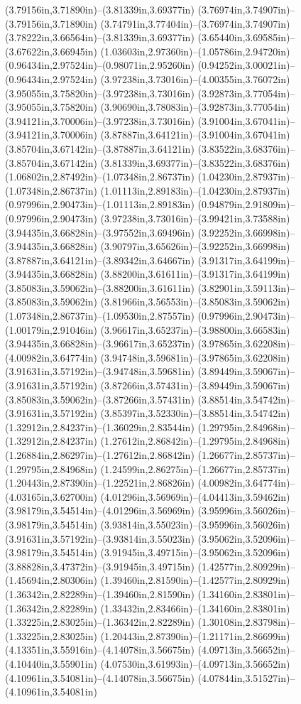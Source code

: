 (3.79156in,3.71890in)--(3.81339in,3.69377in) (3.76974in,3.74907in)--(3.79156in,3.71890in) (3.74791in,3.77404in)--(3.76974in,3.74907in) (3.78222in,3.66564in)--(3.81339in,3.69377in) (3.65440in,3.69585in)--(3.67622in,3.66945in) (1.03603in,2.97360in)--(1.05786in,2.94720in) (0.96434in,2.97524in)--(0.98071in,2.95260in) (0.94252in,3.00021in)--(0.96434in,2.97524in) (3.97238in,3.73016in)--(4.00355in,3.76072in) (3.95055in,3.75820in)--(3.97238in,3.73016in) (3.92873in,3.77054in)--(3.95055in,3.75820in) (3.90690in,3.78083in)--(3.92873in,3.77054in) (3.94121in,3.70006in)--(3.97238in,3.73016in) (3.91004in,3.67041in)--(3.94121in,3.70006in) (3.87887in,3.64121in)--(3.91004in,3.67041in) (3.85704in,3.67142in)--(3.87887in,3.64121in) (3.83522in,3.68376in)--(3.85704in,3.67142in) (3.81339in,3.69377in)--(3.83522in,3.68376in) (1.06802in,2.87492in)--(1.07348in,2.86737in) (1.04230in,2.87937in)--(1.07348in,2.86737in) (1.01113in,2.89183in)--(1.04230in,2.87937in) (0.97996in,2.90473in)--(1.01113in,2.89183in) (0.94879in,2.91809in)--(0.97996in,2.90473in) (3.97238in,3.73016in)--(3.99421in,3.73588in) (3.94435in,3.66828in)--(3.97552in,3.69496in) (3.92252in,3.66998in)--(3.94435in,3.66828in) (3.90797in,3.65626in)--(3.92252in,3.66998in) (3.87887in,3.64121in)--(3.89342in,3.64667in) (3.91317in,3.64199in)--(3.94435in,3.66828in) (3.88200in,3.61611in)--(3.91317in,3.64199in) (3.85083in,3.59062in)--(3.88200in,3.61611in) (3.82901in,3.59113in)--(3.85083in,3.59062in) (3.81966in,3.56553in)--(3.85083in,3.59062in) (1.07348in,2.86737in)--(1.09530in,2.87557in) (0.97996in,2.90473in)--(1.00179in,2.91046in) (3.96617in,3.65237in)--(3.98800in,3.66583in) (3.94435in,3.66828in)--(3.96617in,3.65237in) (3.97865in,3.62208in)--(4.00982in,3.64774in) (3.94748in,3.59681in)--(3.97865in,3.62208in) (3.91631in,3.57192in)--(3.94748in,3.59681in) (3.89449in,3.59067in)--(3.91631in,3.57192in) (3.87266in,3.57431in)--(3.89449in,3.59067in) (3.85083in,3.59062in)--(3.87266in,3.57431in) (3.88514in,3.54742in)--(3.91631in,3.57192in) (3.85397in,3.52330in)--(3.88514in,3.54742in) (1.32912in,2.84237in)--(1.36029in,2.83544in) (1.29795in,2.84968in)--(1.32912in,2.84237in) (1.27612in,2.86842in)--(1.29795in,2.84968in) (1.26884in,2.86297in)--(1.27612in,2.86842in) (1.26677in,2.85737in)--(1.29795in,2.84968in) (1.24599in,2.86275in)--(1.26677in,2.85737in) (1.20443in,2.87390in)--(1.22521in,2.86826in) (4.00982in,3.64774in)--(4.03165in,3.62700in) (4.01296in,3.56969in)--(4.04413in,3.59462in) (3.98179in,3.54514in)--(4.01296in,3.56969in) (3.95996in,3.56026in)--(3.98179in,3.54514in) (3.93814in,3.55023in)--(3.95996in,3.56026in) (3.91631in,3.57192in)--(3.93814in,3.55023in) (3.95062in,3.52096in)--(3.98179in,3.54514in) (3.91945in,3.49715in)--(3.95062in,3.52096in) (3.88828in,3.47372in)--(3.91945in,3.49715in) (1.42577in,2.80929in)--(1.45694in,2.80306in) (1.39460in,2.81590in)--(1.42577in,2.80929in) (1.36342in,2.82289in)--(1.39460in,2.81590in) (1.34160in,2.83801in)--(1.36342in,2.82289in) (1.33432in,2.83466in)--(1.34160in,2.83801in) (1.33225in,2.83025in)--(1.36342in,2.82289in) (1.30108in,2.83798in)--(1.33225in,2.83025in) (1.20443in,2.87390in)--(1.21171in,2.86699in) (4.13351in,3.55916in)--(4.14078in,3.56675in) (4.09713in,3.56652in)--(4.10440in,3.55901in) (4.07530in,3.61993in)--(4.09713in,3.56652in) (4.10961in,3.54081in)--(4.14078in,3.56675in) (4.07844in,3.51527in)--(4.10961in,3.54081in) 